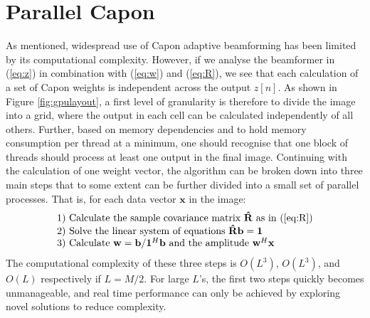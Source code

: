 \documentclass[journal]{IEEEtran}
\newcommand{\mat}[1]{\mathbf{#1}}
\renewcommand{\vec}[1]{\mathbf{#1}}
\begin{document}
\section{Parallel Capon}\label{sec:meth}
As mentioned, widespread use of Capon adaptive beamforming has been limited by its computational complexity. However, if we analyse the beamformer in (\ref{eq:z}) in combination with (\ref{eq:w}) and (\ref{eq:R}), we see that each calculation of a set of Capon weights is independent across the output $z[n]$. As shown in Figure \ref{fig:gpulayout}, a first level of granularity is therefore to divide the image into a grid, where the output in each cell can be calculated independently of all others. Further, based on memory dependencies and to hold memory consumption per thread at a minimum, one should recognise that one block of threads should process at least one output in the final image. Continuing with the calculation of one weight vector, the algorithm can be broken down into three main steps that to some extent can be further divided into a small set of parallel processes. That is, for each data vector $\vec{x}$ in the image:
\begin{align*}
\begin{array}{l}
\text{1) Calculate the sample covariance matrix } \mat{\hat{R}} \text{ as in (\ref{eq:R})}\\
\text{2) Solve the linear system of equations } \mat{\hat{R}}\vec{b} =\vec{ 1}\\
\text{3) Calculate } \vec{w} = \vec{b}/\vec{1}^H\vec{b} \text{ and the amplitude } \vec{w}^H\vec{x}
\end{array}
\end{align*}
The computational complexity of these three steps is $O(L^3)$, $O(L^3)$, and $O(L)$ respectively if $L = M/2$. For large $L$'s, the first two steps quickly becomes unmanageable, and real time performance can only be achieved by exploring novel solutions to reduce complexity. 
\end{document}
